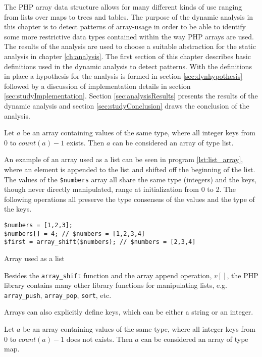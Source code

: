 The PHP array data structure allows for many different kinds of use ranging from lists over maps to trees and tables. The purpose of the dynamic analysis in this chapter is to detect patterns of array-usage in order to be able to identify some more restrictive data types contained within the way PHP arrays are used. The results of the analysis are used to choose a suitable abstraction for the static analysis in chapter \ref{ch:analysis}. The first section of this chapter describes basic definitions used in the dynamic analysis to detect patterns. With the definitions in place a hypothesis for the analysis is formed in section \ref{sec:dynhypothesis} followed by a discussion of implementation details in section \ref{sec:studyImplementation}. Section \ref{sec:analysisResults} presents the results of the dynamic analysis and section \ref{sec:studyConclusion} draws the conclusion of the analysis.

\begin{definition}
Let $a$ be an array containing values of the same type, where all integer keys from 0 to $count(a)-1$ exists. Then $a$ can be considered an array of type list.
\end{definition}

An example of an array used as a list can be seen in program \ref{lst:list_array}, where an element is appended to the list and shifted off the beginning of the list. The values of the \texttt{\$numbers} array all share the same type (integers) and the keys, though never directly manipulated, range at initialization from 0 to 2. The following operations all preserve the type consensus of the values and the type of the keys. 

\begin{program}[ht]
\begin{lstlisting}
$numbers = [1,2,3];
$numbers[] = 4; // $numbers = [1,2,3,4]
$first = array_shift($numbers); // $numbers = [2,3,4]
\end{lstlisting}
\caption{Array used as a list}
\label{lst:list_array}
\end{program}

Besides the \texttt{array\_shift} function and the array append operation, $v[]$, the PHP library contains many other library functions for manipulating lists, e.g. \texttt{array\_push}, \texttt{array\_pop}, \texttt{sort}, etc.

Arrays can also explicitly define keys, which can be either a string or an integer. 

\begin{definition}
Let $a$ be an array containing values of the same type, where all integer keys from 0 to $count(a)-1$ does not exists. Then $a$ can be considered an array of type map.
\end{definition}

